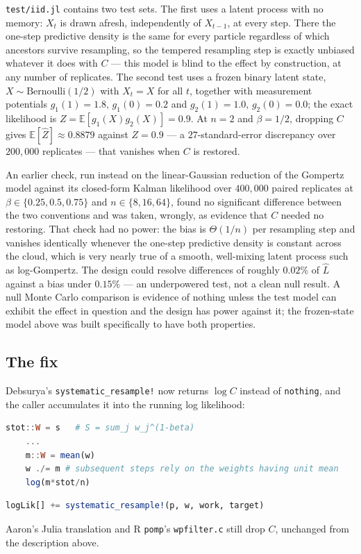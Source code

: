 \documentclass[10pt]{article}
\begin{document}
\texttt{test/iid.jl} contains two test sets. The first uses a latent process
with no memory: $X_t$ is drawn afresh, independently of $X_{t-1}$, at every
step. There the one-step predictive density is the same for every particle
regardless of which ancestors survive resampling, so the tempered
resampling step is exactly unbiased whatever it does with $C$ — this model
is blind to the effect by construction, at any number of replicates. The
second test uses a frozen binary latent state, $X\sim\mathrm{Bernoulli}(1/2)$
with $X_t=X$ for all $t$, together with measurement potentials
$g_1(1)=1.8,\,g_1(0)=0.2$ and $g_2(1)=1.0,\,g_2(0)=0.0$; the exact likelihood
is $Z=\mathbb E[g_1(X)g_2(X)]=0.9$. At $n=2$ and $\beta=1/2$, dropping $C$
gives $\mathbb E[\hat Z]\approx0.8879$ against $Z=0.9$ — a $27$-standard-error
discrepancy over $200{,}000$ replicates — that vanishes when $C$ is restored.

An earlier check, run instead on the linear-Gaussian reduction of the
Gompertz model against its closed-form Kalman likelihood over $400{,}000$
paired replicates at $\beta\in\{0.25,0.5,0.75\}$ and $n\in\{8,16,64\}$, found
no significant difference between the two conventions and was taken,
wrongly, as evidence that $C$ needed no restoring. That check had
no power: the bias is $\Theta(1/n)$ per resampling step and vanishes
identically whenever the one-step predictive density is constant across the
cloud, which is very nearly true of a smooth, well-mixing latent process
such as log-Gompertz. The design could resolve differences of roughly
$0.02\%$ of $\hat L$ against a bias under $0.15\%$ — an underpowered test, not
a clean null result. A null Monte Carlo comparison is evidence of nothing
unless the test model can exhibit the effect in question and the design has
power against it; the frozen-state model above was built specifically to
have both properties.

\subsection*{The fix}

Debsurya's \texttt{systematic\_resample!} now returns $\log C$ instead of
\texttt{nothing}, and the caller accumulates it into the running log
likelihood:
\begin{lstlisting}[language=Julia, caption={PartiallyObservedMarkovProcesses.jl/src/pfilter.jl, lines 481--490 and 315}]
    stot::W = s   # S = sum_j w_j^(1-beta)
    ...
    m::W = mean(w)
    w ./= m # subsequent steps rely on the weights having unit mean
    log(m*stot/n)
\end{lstlisting}
\begin{lstlisting}[language=Julia, caption={The caller, \texttt{pfilt\_step\_comps!}, line 315}]
        logLik[] += systematic_resample!(p, w, work, target)
\end{lstlisting}
Aaron's Julia translation and R \texttt{pomp}'s \texttt{wpfilter.c} still
drop $C$, unchanged from the description above.
\end{document}
